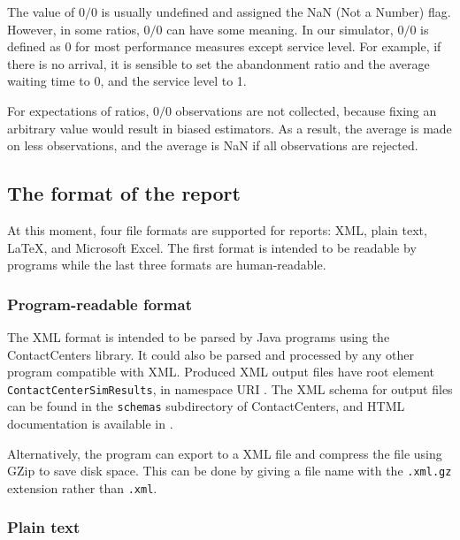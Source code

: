 The value of $0/0$ is usually undefined and assigned the NaN (Not a Number) flag.
However, in some ratios, $0/0$ can have some meaning.
In our simulator, $0/0$ is defined as 0 for most performance measures except service level.
For example, if there is no arrival, it is sensible to set the
abandonment ratio and the average waiting time to 0, and
the service level to 1.

For expectations of ratios, $0/0$ observations are not collected,
because fixing an arbitrary value would result in biased estimators.  As a
result, the average is made on less observations, and the average is
NaN if all observations are rejected.

\subsection{The format of the report}
\label{sec:reportformat}

At this moment, four file formats are supported for reports:
XML, plain text, \LaTeX, and
Microsoft Excel.
The first format is intended to be readable by programs while
the last three formats are human-readable.

\subsubsection{Program-readable format}

The XML format is intended to be parsed by Java programs
using the ContactCenters library.
It could also be parsed and processed by any other program
compatible with XML.
Produced XML output files have root element
\texttt{Contact\-Center\-Sim\-Results}, in
namespace URI
.
The XML schema for output files can be found in the \texttt{schemas}
subdirectory of ContactCenters, and HTML documentation is available
in .

Alternatively, the program can export to a XML file
and compress the file using GZip to save
disk space.
This can be done by giving a file name with the \texttt{.xml.gz}
extension rather than \texttt{.xml}.

\subsubsection{Plain text}

